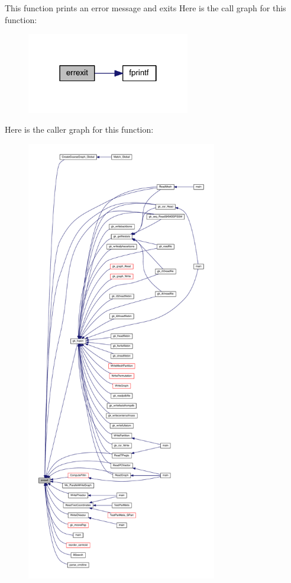 This function prints an error message and exits Here is the call graph for this function\+:\nopagebreak
\begin{figure}[H]
\begin{center}
\leavevmode
\includegraphics[width=202pt]{a00077_a219ed447289ea84042889361cf7e5dc5_cgraph}
\end{center}
\end{figure}
Here is the caller graph for this function\+:\nopagebreak
\begin{figure}[H]
\begin{center}
\leavevmode
\includegraphics[height=550pt]{a00077_a219ed447289ea84042889361cf7e5dc5_icgraph}
\end{center}
\end{figure}
\mbox{\label{a00077_a3b473198519d20a1558f436cff6029e0}} 
